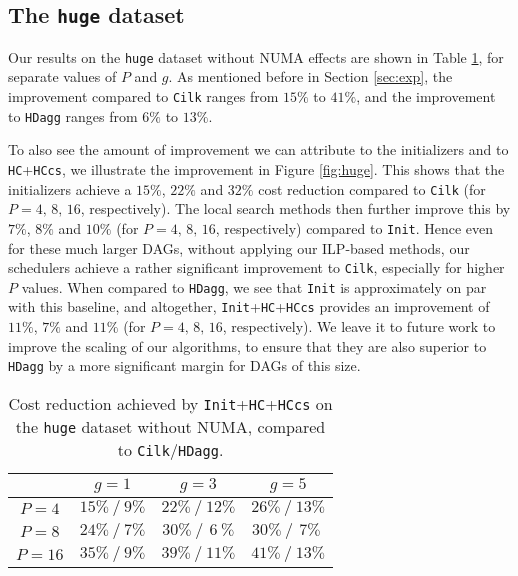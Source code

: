 \documentclass[sigconf,nonacm]{acmart}
\begin{document}
\subsection{The \texttt{huge} dataset}

Our results on the \texttt{huge} dataset without NUMA effects are shown in Table \ref{tab:huge}, for separate values of $P$ and $g$. As mentioned before in Section \ref{sec:exp}, the improvement compared to \texttt{Cilk} ranges from $15\%$ to $41\%$, and the improvement to \texttt{HDagg} ranges from $6\%$ to $13\%$.

To also see the amount of improvement we can attribute to the initializers and to \texttt{HC}+\texttt{HCcs}, we illustrate the improvement in Figure \ref{fig:huge}. This shows that the initializers achieve a $15\%$, $22\%$ and $32\%$ cost reduction compared to \texttt{Cilk} (for $P=4,\, 8, \, 16$, respectively). The local search methods then further improve this by $7\%$, $8\%$ and $10\%$ (for $P=4,\, 8, \, 16$, respectively) compared to \texttt{Init}. Hence even for these much larger DAGs, without applying our ILP-based methods, our schedulers achieve a rather significant improvement to \texttt{Cilk}, especially for higher $P$ values. When compared to \texttt{HDagg}, we see that \texttt{Init} is approximately on par with this baseline, and altogether, \texttt{Init}+\texttt{HC}+\texttt{HCcs} provides an improvement of $11\%$, $7\%$ and $11\%$ (for $P=4,\, 8, \, 16$, respectively). We leave it to future work to improve the scaling of our algorithms, to ensure that they are also superior to \texttt{HDagg} by a more significant margin for DAGs of this size.

\begin{table}
\centering
\caption{Cost reduction achieved by \texttt{Init}+\texttt{HC}+\texttt{HCcs} on the \texttt{huge} dataset without NUMA, compared to \texttt{Cilk}/\texttt{HDagg}.}
\renewcommand{\arraystretch}{1.65}
\begin{tabular}{c || c | c | c|}
  & $g=1$ & $g=3$ & $g=5$ \\ [0.5ex] 
 \hline\hline
 $P=4$ & $15\% \: / \: 9\%$  & $22\% \: / \: 12\%$ & $26\% \: / \: 13\%$ \\ 
 \hline
 $P=8$ & $24\% \: / \: 7\%$ & $30\% \: / \: \, 6\:\%$ & $30\% \: / \: \, 7\%\:$ \\
 \hline
 $P=16$ & $35\% \: / \: 9\%$ & $39\% \: / \: 11\%$ & $41\% \: / \: 13\%$ \\
 \hline
\end{tabular}
\label{tab:huge}
\end{table}
\end{document}
